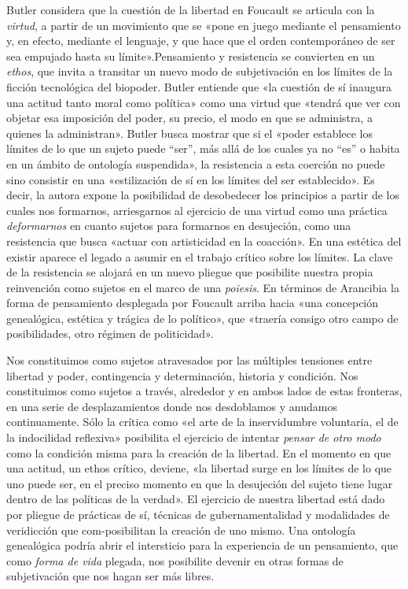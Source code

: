 Butler considera que la cuestión de la libertad en Foucault se articula con la \emph{virtud}, a partir de un movimiento que se «pone en juego mediante el pensamiento y, en efecto, mediante el lenguaje, y que hace que el orden contemporáneo de ser sea empujado hasta su límite».Pensamiento y resistencia se convierten en un \emph{ethos}, que invita a transitar un nuevo modo de subjetivación en los límites de la ficción tecnológica del biopoder. Butler entiende que «la cuestión de sí inaugura una actitud tanto moral como política» como una virtud que «tendrá que ver con objetar esa imposición del poder, su precio, el modo en que se administra, a quienes la administran». Butler busca mostrar que si el «poder establece los límites de lo que un sujeto puede ``ser'', más allá de los cuales ya no ``es'' o habita en un ámbito de ontología suspendida», la resistencia a esta coerción no puede sino consistir en una «estilización de sí en los límites del ser establecido». Es decir, la autora expone la posibilidad de desobedecer los principios a partir de los cuales nos formarnos, arriesgarnos al ejercicio de una virtud como una práctica \emph{deformarnos} en cuanto sujetos para formarnos en desujeción, como una resistencia que busca «actuar con artisticidad en la coacción». En una estética del existir aparece el legado a asumir en el trabajo crítico sobre los límites. La clave de la resistencia se alojará en un nuevo pliegue que posibilite nuestra propia reinvención como sujetos en el marco de una \emph{poiesis}. En términos de Arancibia la forma de pensamiento desplegada por Foucault arriba hacia «una concepción genealógica, estética y trágica de lo político», que «traería consigo otro campo de posibilidades, otro régimen de politicidad».

Nos constituimos como sujetos atravesados por las múltiples tensiones entre libertad y poder, contingencia y determinación, historia y condición. Nos constituimos como sujetos a través, alrededor y en ambos lados de estas fronteras, en una serie de desplazamientos donde nos desdoblamos y anudamos continuamente. Sólo la crítica como «el arte de la inservidumbre voluntaria, el de la indocilidad reflexiva» posibilita el ejercicio de intentar \emph{pensar de otro modo} como la condición misma para la creación de la libertad. En el momento en que una actitud, un ethos crítico, deviene, «la libertad surge en los límites de lo que uno puede ser, en el preciso momento en que la desujeción del sujeto tiene lugar dentro de las políticas de la verdad». El ejercicio de nuestra libertad está dado por pliegue de prácticas de sí, técnicas de gubernamentalidad y modalidades de veridicción que com-posibilitan la creación de uno mismo. Una ontología genealógica podría abrir el intersticio para la experiencia de un pensamiento, que como \emph{forma de vida} plegada, nos posibilite devenir en otras formas de subjetivación que nos hagan ser más libres.

